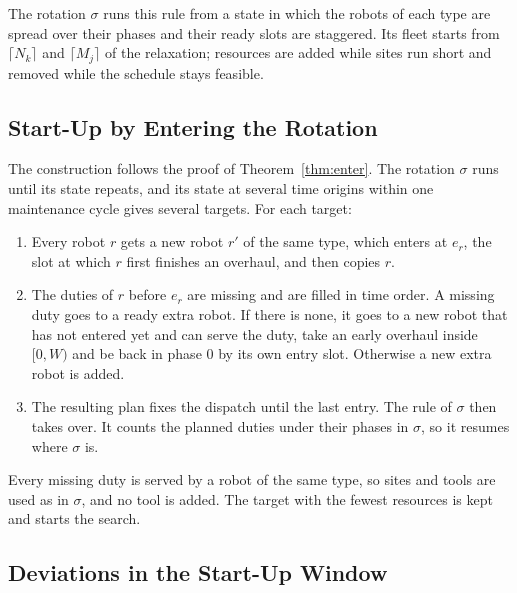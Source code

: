 The rotation $\sigma$ runs this rule from a state in which the robots of each type are spread over their phases and their ready slots are staggered.
Its fleet starts from $\lceil N_k \rceil$ and $\lceil M_j \rceil$ of the relaxation; resources are added while sites run short and removed while the schedule stays feasible.

\subsection{Start-Up by Entering the Rotation}
\label{sec:method:enter}

The construction follows the proof of Theorem~\ref{thm:enter}.
The rotation $\sigma$ runs until its state repeats, and its state at several time origins within one maintenance cycle gives several targets.
For each target:
\begin{enumerate}
  \item Every robot $r$ gets a new robot $r'$ of the same type, which enters at $e_r$, the slot at which $r$ first finishes an overhaul, and then copies $r$.
  \item The duties of $r$ before $e_r$ are missing and are filled in time order. A missing duty goes to a ready extra robot. If there is none, it goes to a new robot that has not entered yet and can serve the duty, take an early overhaul inside $[0, W)$ and be back in phase $0$ by its own entry slot. Otherwise a new extra robot is added.
  \item The resulting plan fixes the dispatch until the last entry. The rule of $\sigma$ then takes over. It counts the planned duties under their phases in $\sigma$, so it resumes where $\sigma$ is.
\end{enumerate}
Every missing duty is served by a robot of the same type, so sites and tools are used as in $\sigma$, and no tool is added.
The target with the fewest resources is kept and starts the search.

\subsection{Deviations in the Start-Up Window}
\label{sec:method:rdd}

